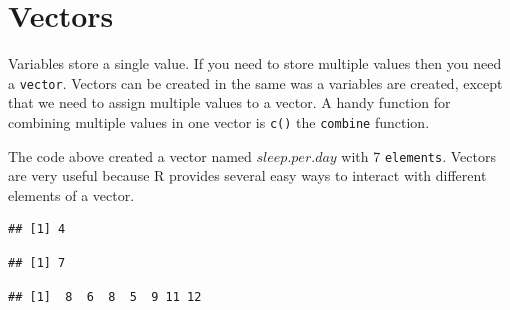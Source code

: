 \documentclass[10pt, letterpaper, twoside]{memoir}\usepackage{knitr}
\begin{document}
\section{Vectors}

Variables store a single value. If you need to store multiple values then you need a \texttt{vector}. Vectors can be created in the same was a variables are created, except that we need to assign multiple values to a vector. A handy function for combining multiple values in one vector is \texttt{c()} the \texttt{combine} function. 

\begin{knitrout}
\color{fgcolor}\begin{kframe}
\begin{alltt}
 \hlkwb{<-} \hlstd{(}\hlstd{,} \hlstd{,} \hlstd{,} \hlstd{,} \hlstd{,} \hlstd{,} \hlstd{)}
\end{alltt}
\end{kframe}
\end{knitrout}

The code above created a vector named $sleep.per.day$ with 7 \texttt{elements}. Vectors are very useful because R provides several easy ways to interact with different elements of a vector.

\begin{knitrout}
\color{fgcolor}\begin{kframe}
\begin{alltt}
\hlstd{sleep.per.day[}\hlstd{]}  
\end{alltt}
\begin{verbatim}
## [1] 4
\end{verbatim}
\begin{alltt}
\hlstd{sleep.per.day[}\hlstd{]} \hlkwb{<-}   
  
\end{alltt}
\begin{verbatim}
## [1] 7
\end{verbatim}
\begin{alltt}
 \hlopt{+}   
\end{alltt}
\begin{verbatim}
## [1]  8  6  8  5  9 11 12
\end{verbatim}
\end{kframe}
\end{knitrout}
\end{document}
